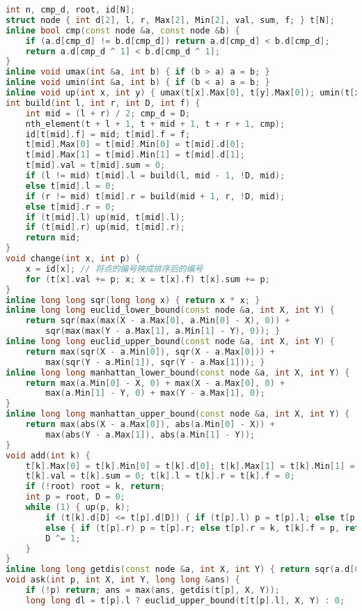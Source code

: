 \documentclass{article}
\begin{document}
\begin{lstlisting}[language=C++]
int n, cmp_d, root, id[N];
struct node { int d[2], l, r, Max[2], Min[2], val, sum, f; } t[N];
inline bool cmp(const node &a, const node &b) {
	if (a.d[cmp_d] != b.d[cmp_d]) return a.d[cmp_d] < b.d[cmp_d];
	return a.d[cmp_d ^ 1] < b.d[cmp_d ^ 1];
}
inline void umax(int &a, int b) { if (b > a) a = b; }
inline void umin(int &a, int b) { if (b < a) a = b; }
inline void up(int x, int y) { umax(t[x].Max[0], t[y].Max[0]); umin(t[x].Min[0], t[y].Min[0]); umax(t[x].Max[1], t[y].Max[1]); umin(t[x].Min[1], t[y].Min[1]); }
int build(int l, int r, int D, int f) {
	int mid = (l + r) / 2; cmp_d = D;
	nth_element(t + l + 1, t + mid + 1, t + r + 1, cmp);
	id[t[mid].f] = mid; t[mid].f = f;
	t[mid].Max[0] = t[mid].Min[0] = t[mid].d[0];
	t[mid].Max[1] = t[mid].Min[1] = t[mid].d[1];
	t[mid].val = t[mid].sum = 0;
	if (l != mid) t[mid].l = build(l, mid - 1, !D, mid);
	else t[mid].l = 0;
	if (r != mid) t[mid].r = build(mid + 1, r, !D, mid);
	else t[mid].r = 0;
	if (t[mid].l) up(mid, t[mid].l);
	if (t[mid].r) up(mid, t[mid].r);
	return mid;
}
void change(int x, int p) {
	x = id[x]; // 将点的编号映成排序后的编号
	for (t[x].val += p; x; x = t[x].f) t[x].sum += p;
}
inline long long sqr(long long x) { return x * x; }
inline long long euclid_lower_bound(const node &a, int X, int Y) {
	return sqr(max(max(X - a.Max[0], a.Min[0] - X), 0)) +
		sqr(max(max(Y - a.Max[1], a.Min[1] - Y), 0)); }
inline long long euclid_upper_bound(const node &a, int X, int Y) {
	return max(sqr(X - a.Min[0]), sqr(X - a.Max[0])) +
		max(sqr(Y - a.Min[1]), sqr(Y - a.Max[1])); }
inline long long manhattan_lower_bound(const node &a, int X, int Y) {
	return max(a.Min[0] - X, 0) + max(X - a.Max[0], 0) + 
		max(a.Min[1] - Y, 0) + max(Y - a.Max[1], 0);
}
inline long long manhattan_upper_bound(const node &a, int X, int Y) {
	return max(abs(X - a.Max[0]), abs(a.Min[0] - X)) + 
		max(abs(Y - a.Max[1]), abs(a.Min[1] - Y));
}
void add(int k) {
	t[k].Max[0] = t[k].Min[0] = t[k].d[0]; t[k].Max[1] = t[k].Min[1] = t[k].d[1];
	t[k].val = t[k].sum = 0; t[k].l = t[k].r = t[k].f = 0;
	if (!root) root = k, return;
	int p = root, D = 0;
	while (1) { up(p, k);
		if (t[k].d[D] <= t[p].d[D]) { if (t[p].l) p = t[p].l; else t[p].l = k, t[k].f = p, return; }
		else { if (t[p].r) p = t[p].r; else t[p].r = k, t[k].f = p, return; } 
		D ^= 1;
	}
}
inline long long getdis(const node &a, int X, int Y) { return sqr(a.d[0] - X) + sqr(a.d[1] - Y); }
void ask(int p, int X, int Y, long long &ans) {
	if (!p) return; ans = max(ans, getdis(t[p], X, Y));
	long long dl = t[p].l ? euclid_upper_bound(t[t[p].l], X, Y) : 0;

\end{lstlisting}
\end{document}
